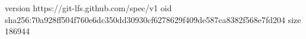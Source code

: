 version https://git-lfs.github.com/spec/v1
oid sha256:70a928ff504f760e6dc350dd30930cf6278629f409de587ca8382f568e7fd204
size 186944
